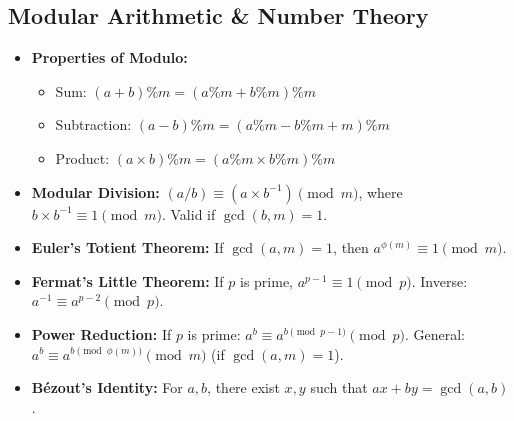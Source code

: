 
\subsection{Modular Arithmetic \& Number Theory}

\begin{itemize}
    \item \textbf{Properties of Modulo:}
    \begin{itemize}
        \item Sum: $(a + b) \% m = (a \% m + b \% m) \% m$
        \item Subtraction: $(a - b) \% m = (a \% m - b \% m + m) \% m$
        \item Product: $(a \times b) \% m = (a \% m \times b \% m) \% m$
    \end{itemize}

    \item \textbf{Modular Division:} 
    $(a / b) \equiv (a \times b^{-1}) \pmod m$, where $b \times b^{-1} \equiv 1 \pmod m$. 
    Valid if $\gcd(b, m) = 1$.

    \item \textbf{Euler's Totient Theorem:} 
    If $\gcd(a, m) = 1$, then $a^{\phi(m)} \equiv 1 \pmod m$.

    \item \textbf{Fermat's Little Theorem:} 
    If $p$ is prime, $a^{p-1} \equiv 1 \pmod p$.
    Inverse: $a^{-1} \equiv a^{p-2} \pmod p$.

    \item \textbf{Power Reduction:} 
    If $p$ is prime: $a^b \equiv a^{b \pmod{p-1}} \pmod p$.
    General: $a^b \equiv a^{b \pmod{\phi(m)}} \pmod m$ (if $\gcd(a, m) = 1$).

    \item \textbf{Bézout's Identity:} 
    For $a, b$, there exist $x, y$ such that $ax + by = \gcd(a, b)$.
\end{itemize}